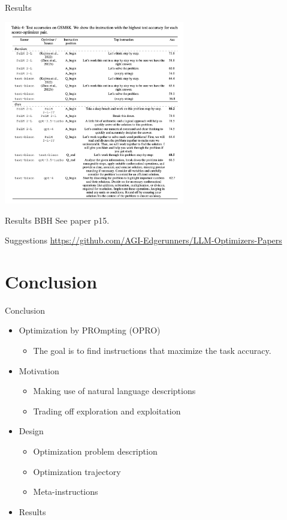 \documentclass[aspectratio=1610,xcolor={dvipsnames},hyperref={colorlinks,unicode,linkcolor=violet,anchorcolor=BlueViolet,citecolor=YellowOrange,filecolor=black,urlcolor=Aquamarine}]{beamer}
\begin{document}
\begin{frame}[label={sec:orgd9e9b57}]{Results}
\begin{center}
\includegraphics[height=8cm]{./p8.png}
\end{center}
\end{frame}
\begin{frame}[label={sec:orge40bc21}]{Results BBH}
See paper p15.
\end{frame}
\begin{frame}[label={sec:orgfefe7e0}]{Suggestions}
\url{https://github.com/AGI-Edgerunners/LLM-Optimizers-Papers}
\end{frame}
\section{Conclusion}
\label{sec:org5a8d72f}

\begin{frame}[label={sec:orgb6fffa1}]{Conclusion}
\begin{itemize}
\item Optimization by PROmpting (OPRO)
\begin{itemize}
\item The goal is to find instructions that maximize the task accuracy.
\end{itemize}
\item Motivation
\begin{itemize}
\item Making use of natural language descriptions
\item Trading off exploration and exploitation
\end{itemize}
\item Design
\begin{itemize}
\item Optimization problem description
\item Optimization trajectory
\item Meta-instructions
\end{itemize}
\item Results
\end{itemize}
\end{frame}
\end{document}

